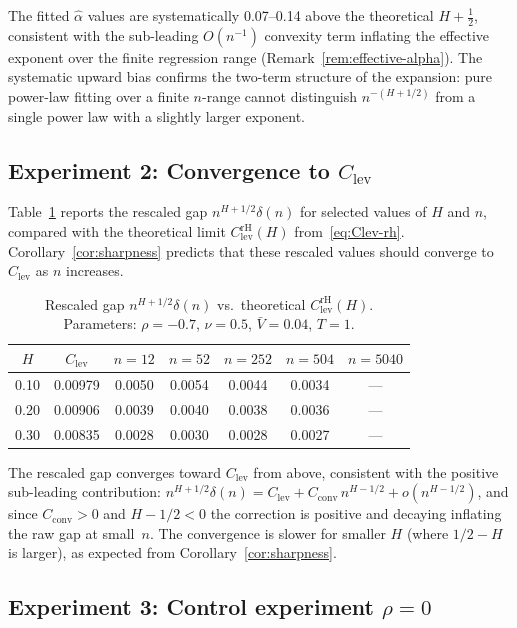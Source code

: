 \documentclass[12pt]{article}
\theoremstyle{definition}
\begin{document}
The fitted $\hat\alpha$ values are systematically 0.07--0.14 above the
theoretical $H + \tfrac12$, consistent with the sub-leading
$O(n^{-1})$ convexity term inflating the effective exponent over
the finite regression range
(Remark~\ref{rem:effective-alpha}).
The systematic upward bias confirms the two-term structure of the
expansion: pure power-law fitting over a finite $n$-range cannot
distinguish $n^{-(H+1/2)}$ from a single power law with a slightly
larger exponent.

\subsection{Experiment 2: Convergence to $C_{\mathrm{lev}}$}
\label{sec:exp2}

Table~\ref{tab:rescaled} reports the rescaled gap
$n^{H+1/2}\delta(n)$ for selected values of $H$ and $n$, compared
with the theoretical limit $C_{\mathrm{lev}}^{\mathrm{rH}}(H)$
from~\eqref{eq:Clev-rh}.
Corollary~\ref{cor:sharpness} predicts that these rescaled values
should converge to $C_{\mathrm{lev}}$ as $n$ increases.

\begin{table}[htbp]
\centering
\caption{Rescaled gap $n^{H+1/2}\delta(n)$ vs.\ theoretical
$C_{\mathrm{lev}}^{\mathrm{rH}}(H)$.
Parameters: $\rho = -0.7$, $\nu = 0.5$, $\bar V = 0.04$, $T = 1$.}
\label{tab:rescaled}
\begin{tabular}{ccccccc}
\toprule
$H$ & $C_{\mathrm{lev}}$ &
$n = 12$ & $n = 52$ & $n = 252$ & $n = 504$ & $n = 5040$ \\
\midrule
0.10 & 0.00979 &
  0.0050 & 0.0054 & 0.0044 & 0.0034 & --- \\
0.20 & 0.00906 &
  0.0039 & 0.0040 & 0.0038 & 0.0036 & --- \\
0.30 & 0.00835 &
  0.0028 & 0.0030 & 0.0028 & 0.0027 & --- \\
\bottomrule
\end{tabular}
\end{table}

The rescaled gap converges toward $C_{\mathrm{lev}}$ from above,
consistent with the positive sub-leading contribution:
$n^{H+1/2}\delta(n) = C_{\mathrm{lev}} + C_{\mathrm{conv}}\,n^{H-1/2}
+ o(n^{H-1/2})$, and since $C_{\mathrm{conv}} > 0$ and $H - 1/2 < 0$
the correction is positive and decaying
inflating the raw gap at small~$n$.
The convergence is slower for smaller $H$ (where $1/2 - H$ is larger),
as expected from Corollary~\ref{cor:sharpness}.

\subsection{Experiment 3: Control experiment $\rho = 0$}
\label{sec:exp3}
\end{document}
